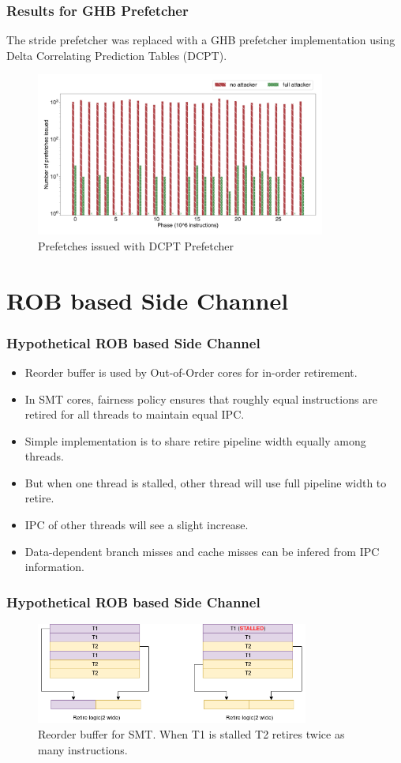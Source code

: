 \documentclass[10pt]{beamer}
\begin{document}
\begin{frame}
\frametitle{Results for GHB Prefetcher}
The stride prefetcher was replaced with a GHB prefetcher implementation
using Delta Correlating Prediction Tables (DCPT).
\begin{figure}[ht]
    \centering
    \includegraphics[width=0.85\textwidth]{dcpt-hwpf}
    \caption{Prefetches issued with DCPT Prefetcher}
\end{figure}
\end{frame}

\section{ROB based Side Channel}
\begin{frame}
\frametitle{Hypothetical ROB based Side Channel}
\begin{itemize}
    \item Reorder buffer is used by Out-of-Order cores for in-order retirement.
    \item In SMT cores, fairness policy ensures that roughly equal instructions are retired for all threads to maintain equal IPC.
    \item Simple implementation is to share retire pipeline width equally among threads.
    \item But when one thread is stalled, other thread will use full pipeline width to retire.
    \item IPC of other threads will see a slight increase.
    \item Data-dependent branch misses and cache misses can be infered from IPC information.
\end{itemize}
\end{frame}

\begin{frame}
\frametitle{Hypothetical ROB based Side Channel}
\begin{figure}
\centering
\includegraphics[width=0.8\textwidth]{rob_side_channel}
\caption{Reorder buffer for SMT. When T1 is stalled T2 retires twice as many instructions.}
\end{figure}
\end{frame}
\end{document}
